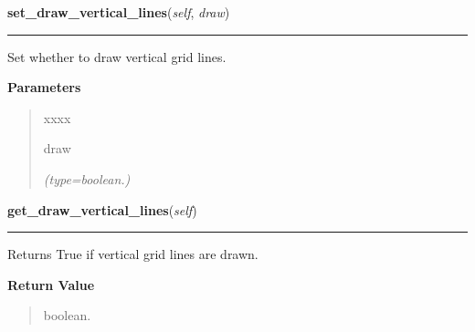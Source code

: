     \label{pygtk_chart:line_chart:Grid:set_draw_vertical_lines}

    \vspace{0.5ex}

\hspace{.8\funcindent}\begin{boxedminipage}{\funcwidth}

    \raggedright \textbf{set\_draw\_vertical\_lines}(\textit{self}, \textit{draw})

    \vspace{-1.5ex}

    \rule{\textwidth}{0.5\fboxrule}
\setlength{\parskip}{2ex}
    Set whether to draw vertical grid lines.

\setlength{\parskip}{1ex}
      \textbf{Parameters}
      \vspace{-1ex}

      \begin{quote}
        \begin{Ventry}{xxxx}

          \item[draw]

            {\it (type=boolean.)}

        \end{Ventry}

      \end{quote}

    \end{boxedminipage}

    \label{pygtk_chart:line_chart:Grid:get_draw_vertical_lines}

    \vspace{0.5ex}

\hspace{.8\funcindent}\begin{boxedminipage}{\funcwidth}

    \raggedright \textbf{get\_draw\_vertical\_lines}(\textit{self})

    \vspace{-1.5ex}

    \rule{\textwidth}{0.5\fboxrule}
\setlength{\parskip}{2ex}
    Returns True if vertical grid lines are drawn.

\setlength{\parskip}{1ex}
      \textbf{Return Value}
    \vspace{-1ex}

      \begin{quote}
      boolean.

      \end{quote}

    \end{boxedminipage}

